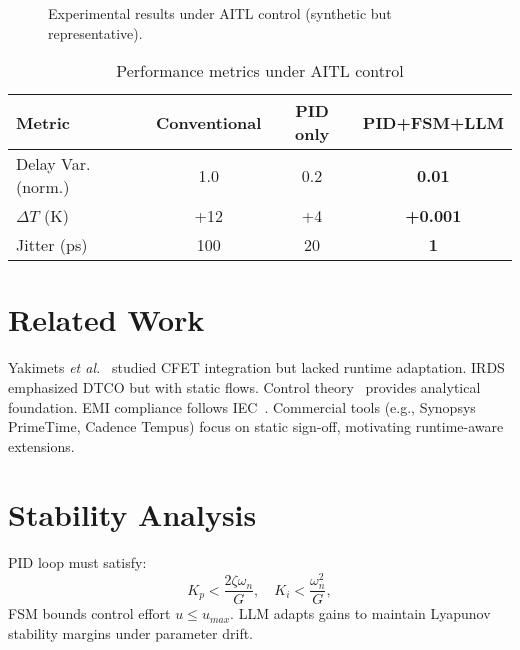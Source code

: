 \documentclass[conference]{IEEEtran}
\begin{document}
\begin{figure*}[!t]

  \caption{Experimental results under AITL control (synthetic but representative).}
  \label{fig:results}
\end{figure*}
 
\begin{table}[t]
\centering
\caption{Performance metrics under AITL control}
\label{tab:perf}
\begin{tabular}{lccc}
\hline
Metric & Conventional & PID only & PID+FSM+LLM \\
\hline
Delay Var. (norm.) & 1.0 & 0.2 & \textbf{0.01} \\
$\Delta T$ (K)     & +12 & +4  & \textbf{+0.001} \\
Jitter (ps)        & 100 & 20  & \textbf{1} \\
\hline
\end{tabular}
\end{table}

\section{Related Work}
Yakimets \textit{et al.}~\cite{yakimets2020cfet} studied CFET integration but lacked runtime adaptation.
IRDS~\cite{irds2023} emphasized DTCO but with static flows.
Control theory~\cite{franklin2015feedback,khalil2002nonlinear,anderson2007optimal} provides analytical foundation.
EMI compliance follows IEC~\cite{iec61000}.
Commercial tools (e.g., Synopsys PrimeTime, Cadence Tempus) focus on static sign-off, motivating runtime-aware extensions.

\section{Stability Analysis}
PID loop must satisfy:
\begin{equation}
K_p < \frac{2\zeta\omega_n}{G}, \quad K_i < \frac{\omega_n^2}{G},
\end{equation}
FSM bounds control effort $u \le u_{max}$.
LLM adapts gains to maintain Lyapunov stability margins under parameter drift.
\end{document}

